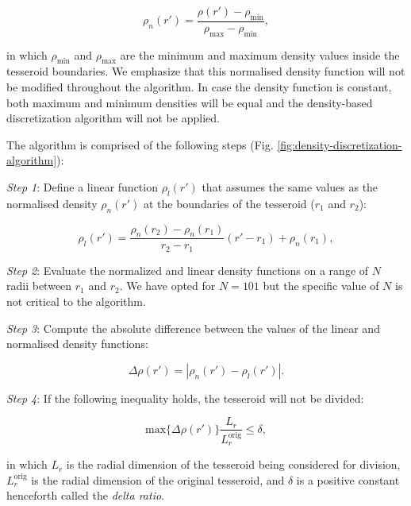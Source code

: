 \documentclass[extra, referee]{gji}
\begin{document}
\begin{equation}
    \rho_n(r') =
    \frac{\rho(r') - \rho_\text{min}}{\rho_\text{max} - \rho_\text{min}},
\end{equation}

\noindent in which $\rho_\text{min}$ and $\rho_\text{max}$ are the minimum and maximum
density values inside the tesseroid boundaries.
We emphasize that this normalised density function will not be modified throughout the
algorithm.
In case the density function is constant, both maximum and minimum densities will be
equal and the density-based discretization algorithm will not be applied.

The algorithm is comprised of the following steps
(Fig. \ref{fig:density-discretization-algorithm}):

\textit{Step 1}:
Define a linear function $\rho_l(r')$ that assumes
the same values as the normalised density $\rho_n(r')$ at the boundaries of the
tesseroid ($r_1$ and $r_2$):

\begin{equation}
    \rho_l(r') =
    \frac{ \rho_n(r_2) - \rho_n(r_1) }{ r_2 - r_1 } (r' - r_1) + \rho_n(r_1),
    \label{eq:density-reference-line}
\end{equation}

\textit{Step 2}:
Evaluate the normalized and linear density functions on a range of $N$ radii between
$r_1$ and $r_2$.
We have opted for $N = 101$ but the specific value of $N$ is not critical to the
algorithm.

\textit{Step 3}:
Compute the absolute difference between the values of the linear and normalised density
functions:

\begin{equation}
    \Delta \rho (r') = | \rho_n(r') - \rho_l(r') |.
    \label{eq:density-abs-diff}
\end{equation}

\textit{Step 4}:
If the following inequality holds, the tesseroid will not be divided:

\begin{equation}
    \text{max}\{ \Delta \rho(r') \} \frac{L_r}{L_r^\text{orig}} \le \delta,
    \label{eq:delta-density}
\end{equation}

\noindent
in which $L_r$ is the radial dimension of the tesseroid being considered for division,
$L_r^\text{orig}$ is the radial dimension of the original tesseroid, and
$\delta$ is a positive constant henceforth called the \textit{delta ratio}.
\end{document}
